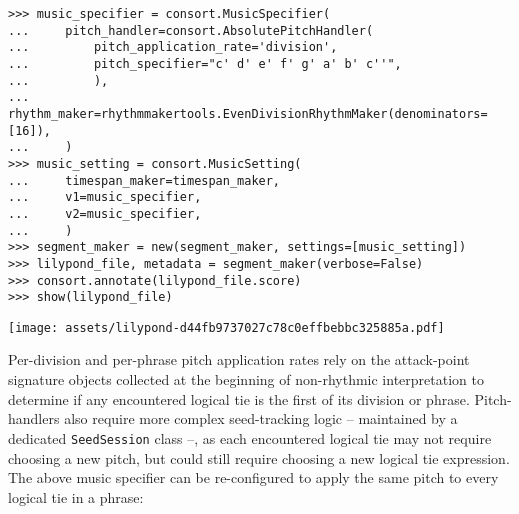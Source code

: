 \begin{abjadbookoutput}
\begin{singlespacing}
\vspace{-0.5\baselineskip}
\begin{verbatim}
>>> music_specifier = consort.MusicSpecifier(
...     pitch_handler=consort.AbsolutePitchHandler(
...         pitch_application_rate='division',
...         pitch_specifier="c' d' e' f' g' a' b' c''",
...         ),
...     rhythm_maker=rhythmmakertools.EvenDivisionRhythmMaker(denominators=[16]),
...     )
>>> music_setting = consort.MusicSetting(
...     timespan_maker=timespan_maker,
...     v1=music_specifier,
...     v2=music_specifier,
...     )
>>> segment_maker = new(segment_maker, settings=[music_setting])
>>> lilypond_file, metadata = segment_maker(verbose=False)
>>> consort.annotate(lilypond_file.score)
>>> show(lilypond_file)
\end{verbatim}
\noindent\texttt{[image: assets/lilypond-d44fb9737027c78c0effbebbc325885a.pdf]}
\end{singlespacing}
\end{abjadbookoutput}

\noindent Per-division and per-phrase pitch application rates rely on the
attack-point signature objects collected at the beginning of non-rhythmic
interpretation to determine if any encountered logical tie is the first of its
division or phrase. Pitch-handlers also require more complex seed-tracking
logic -- maintained by a dedicated \texttt{SeedSession} class --, as each
encountered logical tie may not require choosing a new pitch, but could still
require choosing a new logical tie expression. The above music specifier can be
re-configured to apply the same pitch to every logical tie in a phrase:

\begin{comment}
<abjad>[stylesheet=../consort.ily]
music_specifier = new(
    music_specifier,
    pitch_handler__pitch_application_rate='phrase',
    )
music_setting = consort.MusicSetting(
    timespan_maker=timespan_maker,
    v1=music_specifier,
    v2=music_specifier,
    )
segment_maker = new(segment_maker, settings=[music_setting])
lilypond_file, metadata = segment_maker(annotate=True, verbose=False)
show(lilypond_file)
</abjad>
\end{comment}


